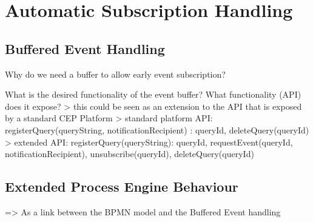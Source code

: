 \chapter{Automatic Subscription Handling}\label{ch:automaticsubscription}

\section{Buffered Event Handling}
Why do we need a buffer to allow early event subscription?

What is the desired functionality of the event buffer? What functionality (API) does it expose?
> this could be seen as an extension to the API that is exposed by a standard CEP Platform
> standard platform API: registerQuery(queryString, notificationRecipient) : queryId, deleteQuery(queryId)
> extended API: registerQuery(queryString): queryId, requestEvent(queryId, notificationRecipient), unsubscribe(queryId), deleteQuery(queryId)




\section{Extended Process Engine Behaviour}
=> As a link between the BPMN model and the Buffered Event handling

